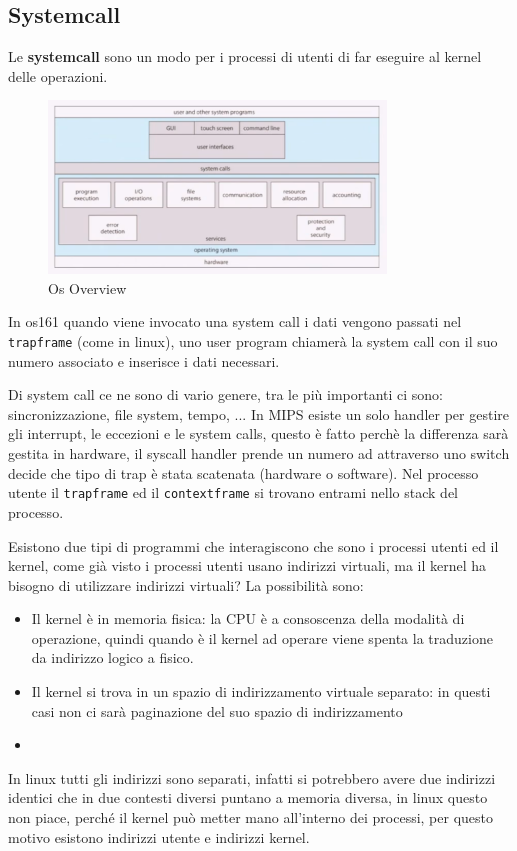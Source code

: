 \documentclass[12pt]{article}
\begin{document}
\subsection{Systemcall}
Le \textbf{systemcall} sono un modo per i processi di utenti di far eseguire al kernel delle operazioni.
\begin{figure}[H]
  \centering
  \includegraphics[width=0.8\textwidth]{os-overview.png}
  \caption{Os Overview}
  \label{fig:os-overview}
\end{figure}
In os161 quando viene invocato una system call i dati vengono passati nel \texttt{trapframe} (come in linux), uno user program chiamer\`a la system call con il suo numero associato e inserisce i dati necessari.

Di system call ce ne sono di vario genere, tra le pi\`u importanti ci sono: sincronizzazione, file system, tempo, ... In MIPS esiste un solo handler per gestire gli interrupt, le eccezioni e le system calls, questo \`e fatto perch\`e la differenza sar\`a gestita in hardware, il syscall handler prende un numero ad attraverso uno switch decide che tipo di trap \`e stata scatenata (hardware o software). Nel processo utente il \texttt{trapframe} ed il \texttt{contextframe} si trovano entrami nello stack del processo.

Esistono due tipi di programmi che interagiscono che sono i processi utenti ed il kernel, come gi\`a visto i processi utenti usano indirizzi virtuali, ma il kernel ha bisogno di utilizzare indirizzi virtuali? La possibilit\`a sono:
\begin{itemize}
  \item Il kernel \`e in memoria fisica: la CPU \`e a consoscenza della modalit\`a di operazione, quindi quando \`e il kernel ad operare viene spenta la traduzione da indirizzo logico a fisico.
  \item Il kernel si trova in un spazio di indirizzamento virtuale separato: in questi casi non ci sar\`a paginazione del suo spazio di indirizzamento
  \item 
\end{itemize}
In linux tutti gli indirizzi sono separati, infatti si potrebbero avere due indirizzi identici che in due contesti diversi puntano a memoria diversa, in linux questo non piace, perch\'e il kernel pu\`o metter mano all'interno dei processi, per questo motivo esistono indirizzi utente e indirizzi kernel.
\end{document}
